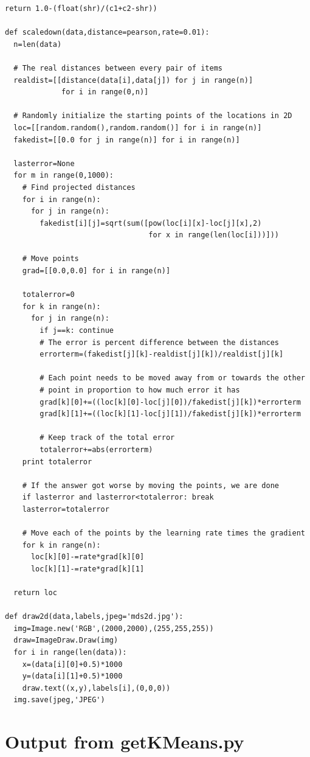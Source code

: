 \documentclass{article}
\begin{document}
\begin{lstlisting}[frame=single, caption=clusters.py, label=clusters]
  return 1.0-(float(shr)/(c1+c2-shr))

def scaledown(data,distance=pearson,rate=0.01):
  n=len(data)

  # The real distances between every pair of items
  realdist=[[distance(data[i],data[j]) for j in range(n)] 
             for i in range(0,n)]

  # Randomly initialize the starting points of the locations in 2D
  loc=[[random.random(),random.random()] for i in range(n)]
  fakedist=[[0.0 for j in range(n)] for i in range(n)]
  
  lasterror=None
  for m in range(0,1000):
    # Find projected distances
    for i in range(n):
      for j in range(n):
        fakedist[i][j]=sqrt(sum([pow(loc[i][x]-loc[j][x],2) 
                                 for x in range(len(loc[i]))]))
  
    # Move points
    grad=[[0.0,0.0] for i in range(n)]
    
    totalerror=0
    for k in range(n):
      for j in range(n):
        if j==k: continue
        # The error is percent difference between the distances
        errorterm=(fakedist[j][k]-realdist[j][k])/realdist[j][k]
        
        # Each point needs to be moved away from or towards the other
        # point in proportion to how much error it has
        grad[k][0]+=((loc[k][0]-loc[j][0])/fakedist[j][k])*errorterm
        grad[k][1]+=((loc[k][1]-loc[j][1])/fakedist[j][k])*errorterm

        # Keep track of the total error
        totalerror+=abs(errorterm)
    print totalerror

    # If the answer got worse by moving the points, we are done
    if lasterror and lasterror<totalerror: break
    lasterror=totalerror
    
    # Move each of the points by the learning rate times the gradient
    for k in range(n):
      loc[k][0]-=rate*grad[k][0]
      loc[k][1]-=rate*grad[k][1]

  return loc

def draw2d(data,labels,jpeg='mds2d.jpg'):
  img=Image.new('RGB',(2000,2000),(255,255,255))
  draw=ImageDraw.Draw(img)
  for i in range(len(data)):
    x=(data[i][0]+0.5)*1000
    y=(data[i][1]+0.5)*1000
    draw.text((x,y),labels[i],(0,0,0))
  img.save(jpeg,'JPEG') 
\end{lstlisting}

\section{Output from getKMeans.py}
\end{document}
